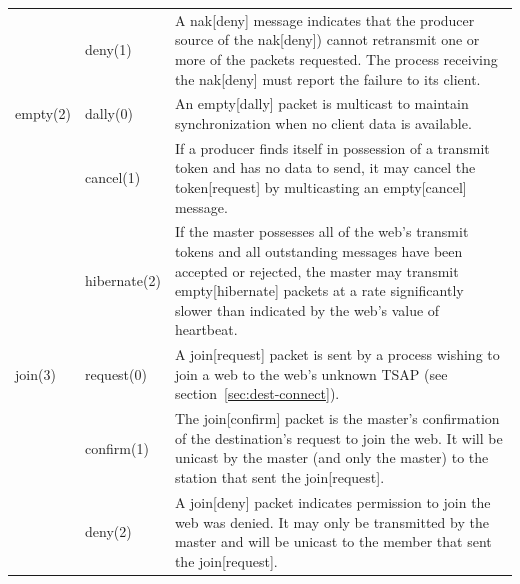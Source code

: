 \documentclass[11pt]{article}
\begin{document}
\begin{center}
\begin{longtable}{llp{}}
            & deny(1)    & A nak[deny] message indicates that the
                           producer source of the nak[deny]) cannot
                           retransmit one or more of the packets
                           requested. The process receiving the
                           nak[deny] must report the failure to its
                           client. \\

   empty(2) & dally(0)   & An empty[dally] packet is multicast to
                           maintain synchronization when no client data
                           is available. \\

            & cancel(1)  & If a producer finds itself in possession of a
                           transmit token and has no data to send, it
                           may cancel the token[request] by multicasting
                           an empty[cancel] message. \\

            & hibernate(2)&If the master possesses all of the web's
                           transmit tokens and all outstanding messages
                           have been accepted or rejected, the master
                           may transmit empty[hibernate] packets at a
                           rate significantly slower than indicated by
                           the web's value of heartbeat. \\

   join(3)  & request(0) & A join[request] packet is sent by a process
                           wishing to join a web to the web's unknown
                           TSAP (see section~\ref{sec:dest-connect}). \\

            & confirm(1) & The join[confirm] packet is the master's
                           confirmation of the destination's request to
                           join the web. It will be unicast by the
                           master (and only the master) to the station
                           that sent the join[request]. \\

            & deny(2)    & A join[deny] packet indicates permission to
                           join the web was denied. It may only be
                           transmitted by the master and will be unicast
                           to the member that sent the join[request]. \\


\end{longtable}
\end{center}
\end{document}
